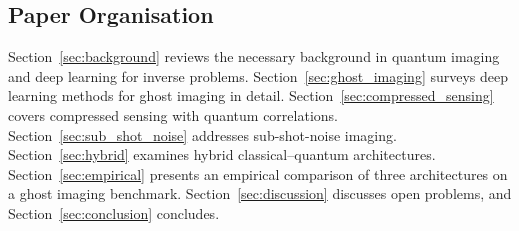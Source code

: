 \subsection{Paper Organisation}

Section~\ref{sec:background} reviews the necessary background in quantum imaging and deep learning for inverse problems. Section~\ref{sec:ghost_imaging} surveys deep learning methods for ghost imaging in detail. Section~\ref{sec:compressed_sensing} covers compressed sensing with quantum correlations. Section~\ref{sec:sub_shot_noise} addresses sub-shot-noise imaging. Section~\ref{sec:hybrid} examines hybrid classical--quantum architectures. Section~\ref{sec:empirical} presents an empirical comparison of three architectures on a ghost imaging benchmark. Section~\ref{sec:discussion} discusses open problems, and Section~\ref{sec:conclusion} concludes.
